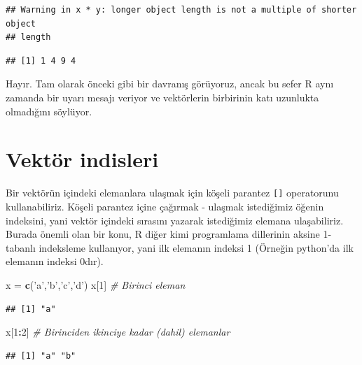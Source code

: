 \documentclass[]{book}
\newenvironment{Shaded}{\begin{snugshade}}{\end{snugshade}}
\newcommand{\CommentTok}[1]{\textcolor[rgb]{0.56,0.35,0.01}{\textit{#1}}}
\newcommand{\DecValTok}[1]{\textcolor[rgb]{0.00,0.00,0.81}{#1}}
\newcommand{\KeywordTok}[1]{\textcolor[rgb]{0.13,0.29,0.53}{\textbf{#1}}}
\newcommand{\NormalTok}[1]{#1}
\newcommand{\OperatorTok}[1]{\textcolor[rgb]{0.81,0.36,0.00}{\textbf{#1}}}
\newcommand{\StringTok}[1]{\textcolor[rgb]{0.31,0.60,0.02}{#1}}
\begin{document}
\begin{verbatim}
## Warning in x * y: longer object length is not a multiple of shorter object
## length
\end{verbatim}

\begin{verbatim}
## [1] 1 4 9 4
\end{verbatim}

Hayır. Tam olarak önceki gibi bir davranış görüyoruz, ancak bu sefer R
aynı zamanda bir uyarı mesajı veriyor ve vektörlerin birbirinin katı
uzunlukta olmadığını söylüyor.

\hypertarget{vektor-indisleri}{%
\section{Vektör indisleri}\label{vektor-indisleri}}

Bir vektörün içindeki elemanlara ulaşmak için köşeli parantez
\texttt{{[}{]}} operatorunu kullanabiliriz. Köşeli parantez içine
çağırmak - ulaşmak istediğimiz öğenin indeksini, yani vektör içindeki
sırasını yazarak istediğimiz elemana ulaşabiliriz. Burada önemli olan
bir konu, R diğer kimi programlama dillerinin aksine 1-tabanlı
indeksleme kullanıyor, yani ilk elemanın indeksi 1 (Örneğin python'da
ilk elemanın indeksi 0dır).

\begin{Shaded}
\begin{Highlighting}[]
\NormalTok{x =}\StringTok{ }\KeywordTok{c}\NormalTok{(}\StringTok{'a'}\NormalTok{,}\StringTok{'b'}\NormalTok{,}\StringTok{'c'}\NormalTok{,}\StringTok{'d'}\NormalTok{)}
\NormalTok{x[}\DecValTok{1}\NormalTok{] }\CommentTok{# Birinci eleman}
\end{Highlighting}
\end{Shaded}

\begin{verbatim}
## [1] "a"
\end{verbatim}

\begin{Shaded}
\begin{Highlighting}[]
\NormalTok{x[}\DecValTok{1}\OperatorTok{:}\DecValTok{2}\NormalTok{] }\CommentTok{# Birinciden ikinciye kadar (dahil) elemanlar}
\end{Highlighting}
\end{Shaded}

\begin{verbatim}
## [1] "a" "b"
\end{verbatim}
\end{document}
